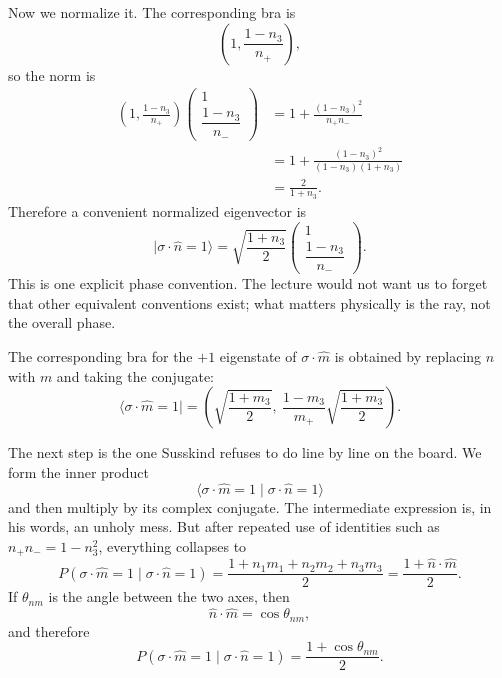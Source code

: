 Now we normalize it. The corresponding bra is
\begin{equation}
\left(
1,\frac{1-n_3}{n_+}
\right),
\end{equation}
so the norm is
\begin{align}
\left(
1,\frac{1-n_3}{n_+}
\right)
\begin{pmatrix}
1\\[4pt]
\dfrac{1-n_3}{n_-}
\end{pmatrix}
&=
1+\frac{(1-n_3)^2}{n_+n_-} \\
&=
1+\frac{(1-n_3)^2}{(1-n_3)(1+n_3)} \\
&=
\frac{2}{1+n_3}.
\end{align}
Therefore a convenient normalized eigenvector is
\begin{equation}
|\sigma\cdot\hat n=1\rangle
=
\sqrt{\frac{1+n_3}{2}}
\begin{pmatrix}
1\\[6pt]
\dfrac{1-n_3}{n_-}
\end{pmatrix}.
\end{equation}
This is one explicit phase convention. The lecture would not want us to forget that other equivalent conventions exist; what matters physically is the ray, not the overall phase.

The corresponding bra for the \(+1\) eigenstate of \(\sigma\cdot\hat m\) is obtained by replacing \(n\) with \(m\) and taking the conjugate:
\begin{equation}
\langle \sigma\cdot\hat m=1|
=
\left(
\sqrt{\frac{1+m_3}{2}},
\ 
\frac{1-m_3}{m_+}\sqrt{\frac{1+m_3}{2}}
\right).
\end{equation}

The next step is the one Susskind refuses to do line by line on the board. We form the inner product
\begin{equation}
\langle \sigma\cdot\hat m=1 \mid \sigma\cdot\hat n=1\rangle
\end{equation}
and then multiply by its complex conjugate. The intermediate expression is, in his words, an unholy mess. But after repeated use of identities such as \(n_+n_-=1-n_3^2\), everything collapses to
\begin{equation}
P(\sigma\cdot\hat m=1 \mid \sigma\cdot\hat n=1)
=
\frac{1+n_1m_1+n_2m_2+n_3m_3}{2}
=
\frac{1+\hat n\cdot\hat m}{2}.
\end{equation}
If \(\theta_{nm}\) is the angle between the two axes, then
\begin{equation}
\hat n\cdot\hat m=\cos\theta_{nm},
\end{equation}
and therefore
\begin{equation}
P(\sigma\cdot\hat m=1 \mid \sigma\cdot\hat n=1)
=
\frac{1+\cos\theta_{nm}}{2}.
\end{equation}


